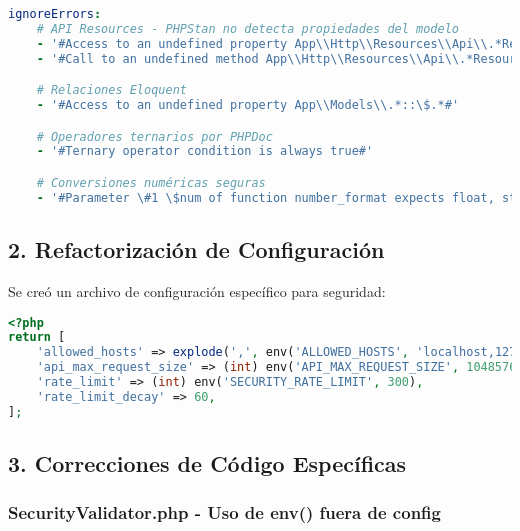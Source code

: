 \documentclass[12pt,a4paper]{article}
\begin{document}
\begin{lstlisting}[language=yaml, caption=Reglas de ignorado implementadas]
ignoreErrors:
    # API Resources - PHPStan no detecta propiedades del modelo
    - '#Access to an undefined property App\\Http\\Resources\\Api\\.*Resource::\$.*#'
    - '#Call to an undefined method App\\Http\\Resources\\Api\\.*Resource::.*\(\)#'

    # Relaciones Eloquent
    - '#Access to an undefined property App\\Models\\.*::\$.*#'

    # Operadores ternarios por PHPDoc
    - '#Ternary operator condition is always true#'

    # Conversiones numéricas seguras
    - '#Parameter \#1 \$num of function number_format expects float, string given#'
\end{lstlisting}

\subsection{2. Refactorización de Configuración}

Se creó un archivo de configuración específico para seguridad:

\begin{lstlisting}[language=php, caption=config/security.php]
<?php
return [
    'allowed_hosts' => explode(',', env('ALLOWED_HOSTS', 'localhost,127.0.0.1')),
    'api_max_request_size' => (int) env('API_MAX_REQUEST_SIZE', 1048576),
    'rate_limit' => (int) env('SECURITY_RATE_LIMIT', 300),
    'rate_limit_decay' => 60,
];
\end{lstlisting}

\subsection{3. Correcciones de Código Específicas}

\subsubsection{SecurityValidator.php - Uso de env() fuera de config}
\end{document}
